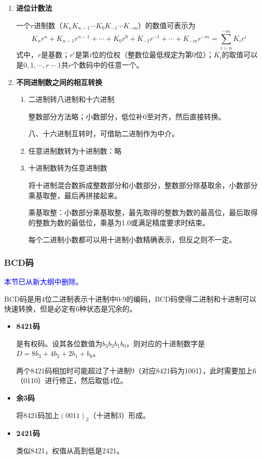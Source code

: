 \documentclass[12pt, a4paper, oneside]{ctexart}
\begin{document}
\begin{enumerate}
  \item {\bf 进位计数法}
  
  一个$r$进制数（$K_n K_{n-1}\cdots K_0 K_{-1}\cdots K_{-m}$）的数值可表示为
  \begin{equation*}
    K_n r^n+K_{n-1}r^{n-1}+\cdots+K_0 r^0+K_{-1}r^{-1}+\cdots+K_{-m}r^{-m}=\sum_{i=n}^{-m}K_i r^i
  \end{equation*}
  式中，$r$是基数；$r^i$是第$i$位的位权（整数位最低规定为第0位）；$K_i$的取值可以是$0,1,\cdots,r-1$共$r$个数码中的任意一个。
  \item {\bf 不同进制数之间的相互转换}
  \begin{enumerate}
    \item 二进制转八进制和十六进制
    
    整数部分方法略；小数部分，低位补0至对齐，然后直接转换。

    八、十六进制互转时，可借助二进制作为中介。

    \item 任意进制数转为十进制数：略
    \item 十进制数转为任意进制数
    
    将十进制混合数拆成整数部分和小数部分，整数部分除基取余，小数部分乘基取整，最后再拼接起来。

    乘基取整：小数部分乘基取整，最先取得的整数为数的最高位，最后取得的整数为数的最低位，乘基为1.0或满足精度要求时结束。

    每个二进制小数都可以用十进制小数精确表示，但反之则不一定。
  \end{enumerate}
\end{enumerate}

\subsubsection{BCD码}

\textcolor{blue}{本节已从新大纲中删除。}

BCD码是用4位二进制表示十进制中0-9的编码，BCD码使得二进制和十进制可以快速转换，但是必定有6种状态是冗余的。

\begin{itemize}
  \item {\bf 8421码}
  
  是有权码。设其各位数值为$b_3 b_2 b_1 b_0$，则对应的十进制数字是$D=8b_3+4b_2+2b_1+b_0$。

  两个8421码相加时可能超过了十进制9（对应8421码为1001），此时需要加上6（0110）进行修正，然后取低4位。

  \item {\bf 余3码}
  
  将8421码加上$(0011)_2$（十进制3）形成。

  \item {\bf 2421码}
  
  类似8421，权值从高到低是2421。
\end{itemize}
\end{document}
